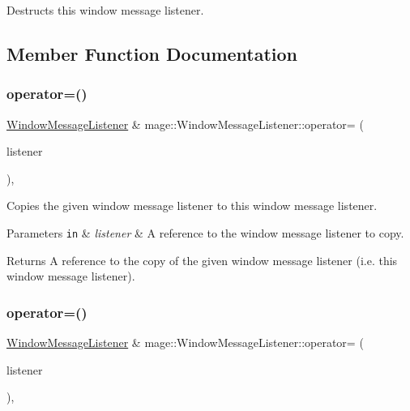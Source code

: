 Destructs this window message listener. 

\subsection{Member Function Documentation}
\hypertarget{classmage_1_1_window_message_listener_a6c4b5ae43b7c1e14d16c3ba639746804}{}\label{classmage_1_1_window_message_listener_a6c4b5ae43b7c1e14d16c3ba639746804} 
\subsubsection{\texorpdfstring{operator=()}{operator=()}\hspace{0.1cm}{\footnotesize\ttfamily [1/2]}}
{\footnotesize\ttfamily \hyperlink{classmage_1_1_window_message_listener}{Window\+Message\+Listener} \& mage\+::\+Window\+Message\+Listener\+::operator= (\begin{DoxyParamCaption}\item[{const \hyperlink{classmage_1_1_window_message_listener}{Window\+Message\+Listener} \&}]{listener }\end{DoxyParamCaption})\hspace{0.3cm}{\ttfamily [default]}, {\ttfamily [noexcept]}}

Copies the given window message listener to this window message listener.


\begin{DoxyParams}[1]{Parameters}
\mbox{\tt in}  & {\em listener} & A reference to the window message listener to copy. \\
\hline
\end{DoxyParams}
\begin{DoxyReturn}{Returns}
A reference to the copy of the given window message listener (i.\+e. this window message listener). 
\end{DoxyReturn}
\hypertarget{classmage_1_1_window_message_listener_a74dee5de5b949db3eb755936ee15ecb9}{}\label{classmage_1_1_window_message_listener_a74dee5de5b949db3eb755936ee15ecb9} 
\subsubsection{\texorpdfstring{operator=()}{operator=()}\hspace{0.1cm}{\footnotesize\ttfamily [2/2]}}
{\footnotesize\ttfamily \hyperlink{classmage_1_1_window_message_listener}{Window\+Message\+Listener} \& mage\+::\+Window\+Message\+Listener\+::operator= (\begin{DoxyParamCaption}\item[{\hyperlink{classmage_1_1_window_message_listener}{Window\+Message\+Listener} \&\&}]{listener }\end{DoxyParamCaption})\hspace{0.3cm}{\ttfamily [default]}, {\ttfamily [noexcept]}}

